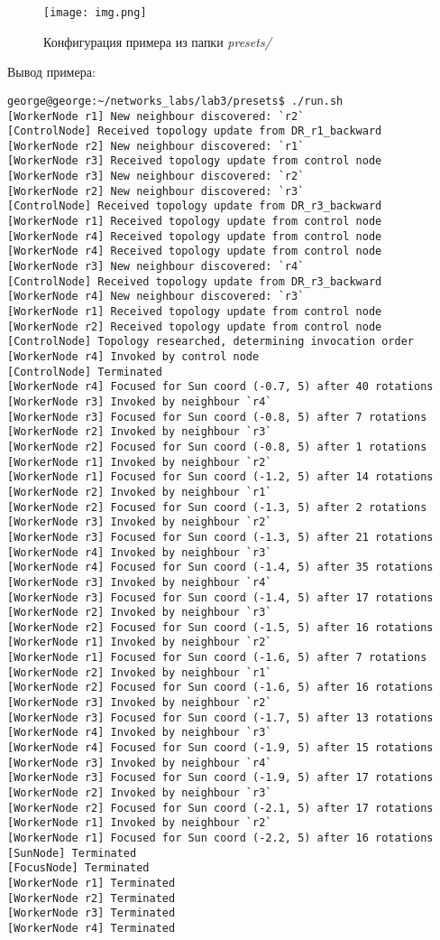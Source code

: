 \documentclass{report}
\begin{document}
\begin{figure}[!htb]
     \centering
     \texttt{[image: img.png]}
     \caption{Конфигурация примера из папки {\it presets/}}\label{Fig:Data1}
\end{figure}

\newline
\newpage
Вывод примера:
\begin{verbatim}
george@george:~/networks_labs/lab3/presets$ ./run.sh
[WorkerNode r1] New neighbour discovered: `r2`
[ControlNode] Received topology update from DR_r1_backward
[WorkerNode r2] New neighbour discovered: `r1`
[WorkerNode r3] Received topology update from control node
[WorkerNode r3] New neighbour discovered: `r2`
[WorkerNode r2] New neighbour discovered: `r3`
[ControlNode] Received topology update from DR_r3_backward
[WorkerNode r1] Received topology update from control node
[WorkerNode r4] Received topology update from control node
[WorkerNode r4] Received topology update from control node
[WorkerNode r3] New neighbour discovered: `r4`
[ControlNode] Received topology update from DR_r3_backward
[WorkerNode r4] New neighbour discovered: `r3`
[WorkerNode r1] Received topology update from control node
[WorkerNode r2] Received topology update from control node
[ControlNode] Topology researched, determining invocation order
[WorkerNode r4] Invoked by control node
[ControlNode] Terminated
[WorkerNode r4] Focused for Sun coord (-0.7, 5) after 40 rotations
[WorkerNode r3] Invoked by neighbour `r4`
[WorkerNode r3] Focused for Sun coord (-0.8, 5) after 7 rotations
[WorkerNode r2] Invoked by neighbour `r3`
[WorkerNode r2] Focused for Sun coord (-0.8, 5) after 1 rotations
[WorkerNode r1] Invoked by neighbour `r2`
[WorkerNode r1] Focused for Sun coord (-1.2, 5) after 14 rotations
[WorkerNode r2] Invoked by neighbour `r1`
[WorkerNode r2] Focused for Sun coord (-1.3, 5) after 2 rotations
[WorkerNode r3] Invoked by neighbour `r2`
[WorkerNode r3] Focused for Sun coord (-1.3, 5) after 21 rotations
[WorkerNode r4] Invoked by neighbour `r3`
[WorkerNode r4] Focused for Sun coord (-1.4, 5) after 35 rotations
[WorkerNode r3] Invoked by neighbour `r4`
[WorkerNode r3] Focused for Sun coord (-1.4, 5) after 17 rotations
[WorkerNode r2] Invoked by neighbour `r3`
[WorkerNode r2] Focused for Sun coord (-1.5, 5) after 16 rotations
[WorkerNode r1] Invoked by neighbour `r2`
[WorkerNode r1] Focused for Sun coord (-1.6, 5) after 7 rotations
[WorkerNode r2] Invoked by neighbour `r1`
[WorkerNode r2] Focused for Sun coord (-1.6, 5) after 16 rotations
[WorkerNode r3] Invoked by neighbour `r2`
[WorkerNode r3] Focused for Sun coord (-1.7, 5) after 13 rotations
[WorkerNode r4] Invoked by neighbour `r3`
[WorkerNode r4] Focused for Sun coord (-1.9, 5) after 15 rotations
[WorkerNode r3] Invoked by neighbour `r4`
[WorkerNode r3] Focused for Sun coord (-1.9, 5) after 17 rotations
[WorkerNode r2] Invoked by neighbour `r3`
[WorkerNode r2] Focused for Sun coord (-2.1, 5) after 17 rotations
[WorkerNode r1] Invoked by neighbour `r2`
[WorkerNode r1] Focused for Sun coord (-2.2, 5) after 16 rotations
[SunNode] Terminated
[FocusNode] Terminated
[WorkerNode r1] Terminated
[WorkerNode r2] Terminated
[WorkerNode r3] Terminated
[WorkerNode r4] Terminated

\end{verbatim}
\end{document}
